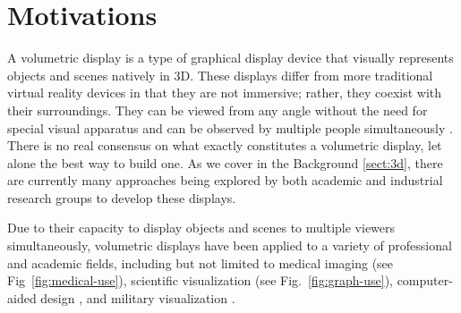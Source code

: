 \section{Motivations}
A volumetric display is a type of graphical display device that visually represents objects and scenes natively in 3D. These displays differ from more traditional virtual reality devices in that they are not immersive; rather, they coexist with their surroundings. They can be viewed from any angle without the need for special visual apparatus and can be observed by multiple people simultaneously \cite{1492264}. There is no real consensus on what exactly constitutes a volumetric display, let alone the best way to build one. As we cover in the Background \ref{sect:3d}, there are currently many approaches being explored by both academic and industrial research groups to develop these displays.

 
\begin{invisBox}
	\hfill
\end{invisBox}

Due to their capacity to display objects and scenes to multiple viewers simultaneously, volumetric displays have been applied to a variety of professional and academic fields, including but not limited to medical imaging \cite{Gong2009-vc} (see Fig~\ref{fig:medical-use}), scientific visualization (see Fig.~\ref{fig:graph-use}), computer-aided design \cite{stickland_development_2003}, and military visualization \cite{10.1117/12.785009} \cite{1492264} \cite{noauthor_bae_nodate}. \\

